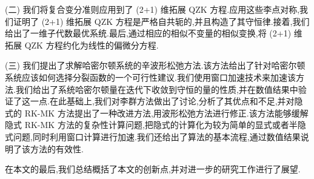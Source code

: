 (二) 我们将复合变分准则应用到了 (2+1) 维拓展 QZK 方程.应用这些李点对称,我们证明了 (2+1) 维拓展 QZK 方程是严格自共轭的,并且构造了其守恒律.接着,我们给出了一维子代数最优系统.最后,通过相应的相似不变量的相似变换,将 (2+1) 维拓展 QZK 方程约化为线性的偏微分方程.

(三) 我们提出了求解哈密尔顿系统的辛波形松弛方法.该方法给出了针对哈密尔顿系统应该如何选择分裂函数的一个可行性建议.我们使用窗口加速技术来加速该方法.我们给出了系统哈密尔顿量在迭代下收敛到守恒的量的性质,并在数值结果中验证了这一点.在此基础上,我们对李群方法做出了讨论,分析了其优点和不足,并对隐式的 RK-MK 方法提出了一种改进方法,用波形松弛方法进行修正.该方法能够缓解隐式 RK-MK 方法的复杂性计算问题,把隐式的计算化为较为简单的显式或者半隐式问题,同时利用窗口计算进行加速.我们还给出了算法的基本流程,通过数值结果说明了该方法的有效性.

在本文的最后,我们总结概括了本文的创新点,并对进一步的研究工作进行了展望.
